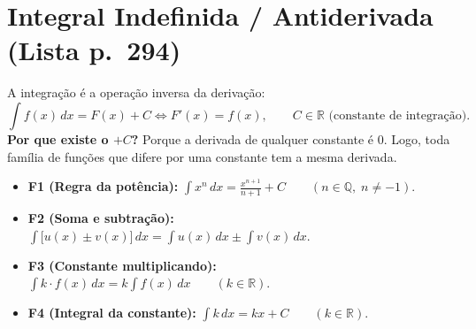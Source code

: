 \documentclass[10pt,a4paper]{article}
\begin{document}
\section{Integral Indefinida / Antiderivada (Lista p.\ 294)}

\begin{defi}
    A integração é a operação inversa da derivação:
    \[
        \int f(x)\,dx = F(x) + C \iff F'(x) = f(x), \qquad C \in \mathbb{R} \text{ (constante de integração)}.
    \]
    \textbf{Por que existe o $+C$?} Porque a derivada de qualquer constante é $0$. Logo, toda família de funções que difere por uma constante tem a mesma derivada.
\end{defi}

\begin{teo}
    \begin{itemize}
        \item \textbf{F1 (Regra da potência):} $\displaystyle \int x^n \, dx = \frac{x^{n+1}}{n+1} + C \qquad (n \in \mathbb{Q}, \; n \neq -1)$.
        \item \textbf{F2 (Soma e subtração):} $\displaystyle \int \big[u(x) \pm v(x)\big]\,dx = \int u(x)\,dx \pm \int v(x)\,dx$.
        \item \textbf{F3 (Constante multiplicando):} $\displaystyle \int k \cdot f(x)\,dx = k \int f(x)\,dx \qquad (k \in \mathbb{R})$.
        \item \textbf{F4 (Integral da constante):} $\displaystyle \int k \, dx = kx + C \qquad (k \in \mathbb{R})$.
    \end{itemize}
\end{teo}
\end{document}
